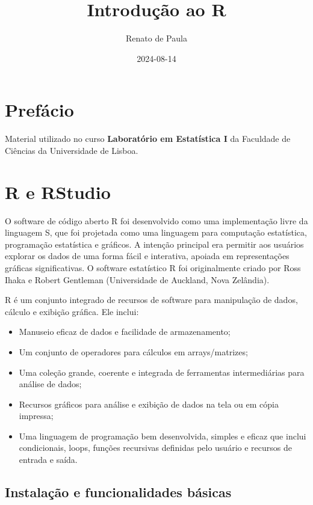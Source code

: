 \documentclass[
]{book}
\title{Introdução ao R}
\author{Renato de Paula}
\date{2024-08-14}
\begin{document}
\maketitle

{
\setcounter{tocdepth}{1}
\tableofcontents
}
\chapter{Prefácio}\label{prefuxe1cio}

Material utilizado no curso \textbf{Laboratório em Estatística I} da Faculdade de Ciências da Universidade de Lisboa.

\chapter{R e RStudio}\label{r-e-rstudio}

O software de código aberto R foi desenvolvido como uma implementação livre da linguagem S, que foi projetada como uma linguagem para computação estatística, programação estatística e gráficos. A intenção principal era permitir aos usuários explorar os dados de uma forma fácil e interativa, apoiada em representações gráficas significativas. O software estatístico R foi originalmente criado por Ross Ihaka e Robert Gentleman (Universidade de Auckland, Nova Zelândia).

R é um conjunto integrado de recursos de software para manipulação de dados, cálculo e exibição gráfica. Ele inclui:

\begin{itemize}
\item
  Manuseio eficaz de dados e facilidade de armazenamento;
\item
  Um conjunto de operadores para cálculos em arrays/matrizes;
\item
  Uma coleção grande, coerente e integrada de ferramentas intermediárias para análise de dados;
\item
  Recursos gráficos para análise e exibição de dados na tela ou em cópia impressa;
\item
  Uma linguagem de programação bem desenvolvida, simples e eficaz que inclui condicionais, loops, funções recursivas definidas pelo usuário e recursos de entrada e saída.
\end{itemize}

\section{Instalação e funcionalidades básicas}\label{instalauxe7uxe3o-e-funcionalidades-buxe1sicas}
\end{document}
